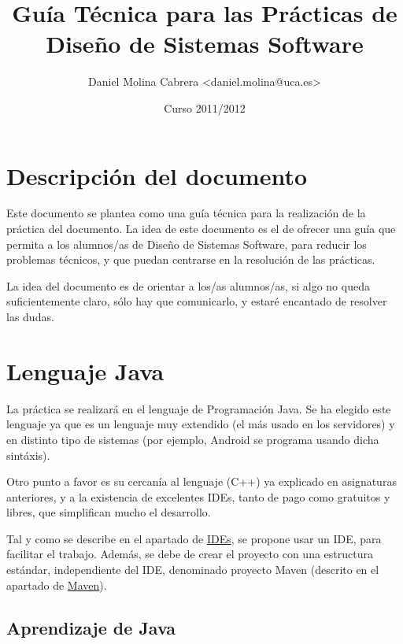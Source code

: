 \documentclass[11pt]{article}
\title{Guía Técnica para las Prácticas de Diseño de Sistemas Software}
\author{Daniel Molina Cabrera <daniel.molina@uca.es>}
\date{Curso 2011/2012}
\begin{document}
\maketitle


\setcounter{tocdepth}{2}
\tableofcontents
\vspace*{1cm}
\newpage
\setlength{\parindent}{0pt}
\setlength{\parskip}{1ex plus 0.5ex minus 0.2ex}


\section{Descripción del documento}
\label{sec-1}




Este documento se plantea como una guía técnica para la realización de la práctica del documento.
La idea de este documento es el de ofrecer una guía que permita a los alumnos/as de Diseño de
Sistemas Software, para reducir los problemas técnicos, y que puedan centrarse en la resolución de
las prácticas.


La idea del documento es de orientar a los/as alumnos/as, si algo no queda suficientemente claro,
sólo hay que comunicarlo, y estaré encantado de resolver las dudas.
\section{Lenguaje Java}
\label{sec-2}


La práctica se realizará en el lenguaje de Programación Java. Se ha elegido este lenguaje ya que 
es un lenguaje muy extendido (el más usado en los servidores) y en distinto tipo de sistemas (por ejemplo, 
Android se programa usando dicha sintáxis).


Otro punto a favor es su cercanía al lenguaje (C++) ya explicado en asignaturas anteriores, y a la existencia
de excelentes IDEs, tanto de pago como gratuitos y libres, que simplifican mucho el desarrollo.


Tal y como se describe en el apartado de \hyperref[sec-3]{IDEs}, se propone usar un IDE, para facilitar el
trabajo. Además, se debe de crear el proyecto con una estructura estándar, independiente del IDE,
denominado proyecto Maven (descrito en el apartado de \hyperref[sec-5]{Maven}).
\subsection{Aprendizaje de Java}
\label{sec-2-1}
\label{fd70e36c-20a8-4577-90be-f671166ae3f1}
\end{document}
